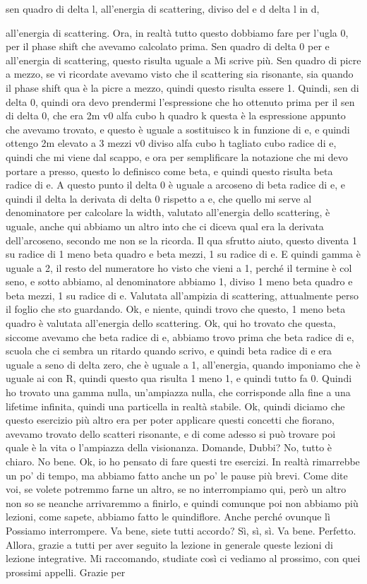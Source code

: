 {\begin{soluzione}
sen quadro di delta l, all'energia di scattering, diviso del e d delta l in d,
   
   all'energia di scattering. Ora, in realtà tutto questo dobbiamo fare per l'ugla 0, per il phase shift che avevamo calcolato prima. Sen quadro di delta 0 per e all'energia di scattering, questo risulta uguale a Mi scrive più. Sen quadro di picre a mezzo, se vi ricordate avevamo visto che il scattering sia risonante, sia quando il phase shift qua è la picre a mezzo, quindi questo risulta essere 1. Quindi, sen di delta 0, quindi ora devo prendermi l'espressione che ho ottenuto prima per il sen di delta 0, che era 2m v0 alfa cubo h quadro k questa è la espressione appunto che avevamo trovato, e questo è uguale a sostituisco k in funzione di e, e quindi ottengo 2m elevato a 3 mezzi v0 diviso alfa cubo h tagliato cubo radice di e, quindi che mi viene dal scappo, e ora per semplificare la notazione che mi devo portare a presso, questo lo definisco come beta, e quindi questo risulta beta radice di e. A questo punto il delta 0 è uguale a arcoseno di beta radice di e, e quindi il delta la derivata di delta 0 rispetto a e, che quello mi serve al denominatore per calcolare la width, valutato all'energia dello scattering, è uguale, anche qui abbiamo un altro into che ci diceva qual era la derivata dell'arcoseno, secondo me non se la ricorda. Il qua sfrutto aiuto, questo diventa 1 su radice di 1 meno beta quadro e beta mezzi, 1 su radice di e. E quindi gamma è uguale a 2, il resto del numeratore ho visto che vieni a 1, perché il termine è col seno, e sotto abbiamo, al denominatore abbiamo 1, diviso 1 meno beta quadro e beta mezzi, 1 su radice di e. Valutata all'ampizia di scattering, attualmente perso il foglio che sto guardando. Ok, e niente, quindi trovo che questo, 1 meno beta quadro è valutata all'energia dello scattering. Ok, qui ho trovato che questa, siccome avevamo che beta radice di e, abbiamo trovo prima che beta radice di e, scuola che ci sembra un ritardo quando scrivo, e quindi beta radice di e era uguale a seno di delta zero, che è uguale a 1, all'energia, quando imponiamo che è uguale ai con R, quindi questo qua risulta 1 meno 1, e quindi tutto fa 0. Quindi ho trovato una gamma nulla, un'ampiazza nulla, che corrisponde alla fine a una lifetime infinita, quindi una particella in realtà stabile. Ok, quindi diciamo che questo esercizio più altro era per poter applicare questi concetti che fiorano, avevamo trovato dello scatteri risonante, e di come adesso si può trovare poi quale è la vita o l'ampiazza della visionanza. Domande, Dubbi? No, tutto è chiaro. No bene. Ok, io ho pensato di fare questi tre esercizi. In realtà rimarrebbe un po' di tempo, ma abbiamo fatto anche un po' le pause più brevi. Come dite voi, se volete potremmo farne un altro, se no interrompiamo qui, però un altro non so se neanche arrivaremmo a finirlo, e quindi comunque poi non abbiamo più lezioni, come sapete, abbiamo fatto le quindiflore. Anche perché ovunque lì Possiamo interrompere. Va bene, siete tutti accordo? Sì, sì, sì. Va bene. Perfetto. Allora, grazie a tutti per aver seguito la lezione in generale queste lezioni di lezione integrative. Mi raccomando, studiate così ci vediamo al prossimo, con quei prossimi appelli. Grazie per 
\end{soluzione}}
